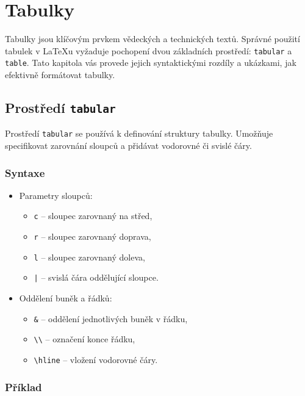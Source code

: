 \chapter{Tabulky}

Tabulky jsou klíčovým prvkem vědeckých a technických textů. Správné použití tabulek v \LaTeX u vyžaduje pochopení dvou základních prostředí: \texttt{tabular} a \texttt{table}. Tato kapitola vás provede jejich syntaktickými rozdíly a ukázkami, jak efektivně formátovat tabulky.

\section{Prostředí \texttt{tabular}}

Prostředí \texttt{tabular} se používá k definování struktury tabulky. Umožňuje specifikovat zarovnání sloupců a přidávat vodorovné či svislé čáry.

\subsection{Syntaxe}

\begin{itemize}
    \item Parametry sloupců:
    \begin{itemize}
        \item \texttt{c} – sloupec zarovnaný na střed,
        \item \texttt{r} – sloupec zarovnaný doprava,
        \item \texttt{l} – sloupec zarovnaný doleva,
        \item \texttt{|} – svislá čára oddělující sloupce.
    \end{itemize}

    \item Oddělení buněk a řádků:
    \begin{itemize}
        \item \texttt{\&} – oddělení jednotlivých buněk v řádku,
        \item \texttt{\textbackslash\textbackslash} – označení konce řádku,
        \item \texttt{\textbackslash hline} – vložení vodorovné čáry.
    \end{itemize}
\end{itemize}

\subsection{Příklad}

